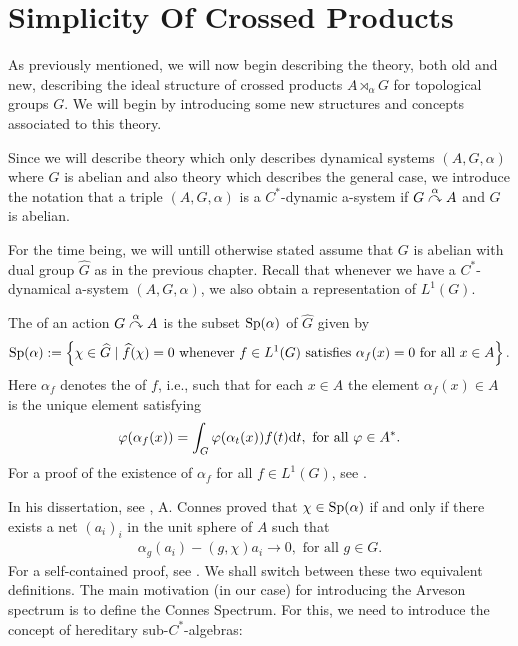 \chapter{Simplicity Of Crossed Products}
As previously mentioned, we will now begin describing the theory, both old and new, describing the ideal structure of crossed products $A \rtimes_\alpha G$ for topological groups $G$. We will begin by introducing some new structures and concepts associated to this theory.

Since we will describe theory which only describes dynamical systems $(A,G,\alpha)$ where $G$ is abelian and also theory which describes the general case, we introduce the notation that a triple $(A, G, \alpha)$ is a $C^*$-dynamic a-system if $G \stackrel{\alpha}{\curvearrowright} A$ and $G$ is abelian. 

For the time being, we will untill otherwise stated assume that $G$ is abelian with dual group $\hat G$ as in the previous chapter. Recall that whenever we have a $C^*$-dynamical a-system $(A, G, \alpha)$, we also obtain a representation of $L^1(G)$.
\begin{definition}
	The  of an action $G \stackrel{\alpha}{\curvearrowright} A$ is the subset $\mathrm{Sp}(\alpha)$ of $\hat G$ given by
	\begin{align*}
		\mathrm{Sp}(\alpha) := \left\{ \chi \in \widehat{G} \mid \widehat{f}(\chi) = 0 \text{ whenever } f \in L^1(G) \text{ satisfies } \alpha_f(x) = 0 \text{ for all } x \in A  \right\}.
	\end{align*}
	Here $\alpha_f$ denotes the  of $f$, i.e., such that for each $x \in A$ the element $\alpha_f(x) \in A$ is the unique element satisfying 
	\begin{align*}
		\varphi(\alpha_f(x)) = \int_G \varphi(\alpha_t(x))f(t) \mathrm{d} t, \text{ for all } \varphi \in A^*.
	\end{align*}
	For a proof of the existence of $\alpha_f$ for all $f \in L^1(G)$, see \cite[Appendix 3, Lemma 7.4.4]{pedersenalgauto}.
\end{definition}
In his dissertation, see \cite{connesclassification}, A. Connes proved that $\chi \in \mathrm{Sp}(\alpha)$ if and only if there exists a net $(a_i)_i$ in the unit sphere of $A$ such that
\begin{align*}
	\alpha_g(a_i) - (g,\chi) a_i \to 0, \text{ for all } g \in G.
\end{align*}
For a self-contained proof, see \cite[Proposition 8.1.9]{pedersenalgauto}. We shall switch between these two equivalent definitions. The main motivation (in our case) for introducing the Arveson spectrum is to define the Connes Spectrum. For this, we need to introduce the concept of hereditary sub-$C^*$-algebras:
